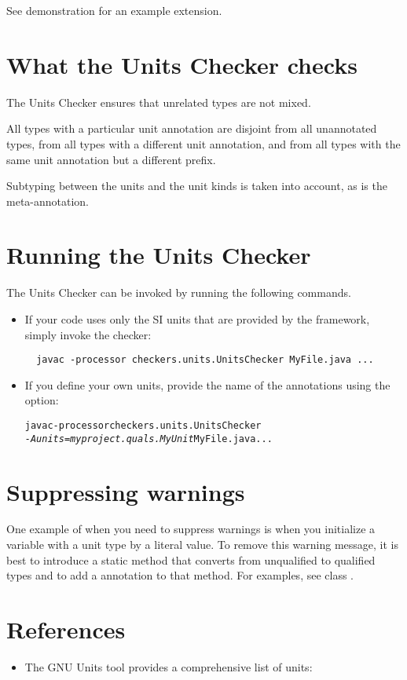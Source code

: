 See demonstration  for an example
extension.



\section{What the Units Checker checks\label{units-checks}}

The Units Checker ensures that unrelated types are not mixed. 

All types with a particular unit annotation are
disjoint from all unannotated types, from all types with a different unit
annotation, and from all types with the same unit annotation but a
different prefix.

Subtyping between the units and the unit kinds is taken into account,
as is the  meta-annotation.



\section{Running the Units Checker\label{units-running}}

The Units Checker can be invoked by running the following commands.

\begin{itemize}
\item
If your code uses only the SI units that are provided by the
framework, simply invoke the checker:

\begin{Verbatim}
  javac -processor checkers.units.UnitsChecker MyFile.java ...
\end{Verbatim}

\item 
If you define your own units, provide the name of the annotations using the
 option:

\begin{alltt}
  javac -processor checkers.units.UnitsChecker
        \textit{-Aunits=myproject.quals.MyUnit} MyFile.java ...
\end{alltt}
\end{itemize}



\section{Suppressing warnings\label{units-suppressing}}

One example of when you need to suppress warnings is when you
initialize a variable with a unit type by a literal value.
To remove this warning message, it is best to introduce a static
method that converts from unqualified to qualified types and to
add a 
annotation to that method.
For examples, see class .


\section{References\label{units-references}}

\begin{itemize}
\item The GNU Units tool provides a comprehensive list of units:
\end{itemize}
